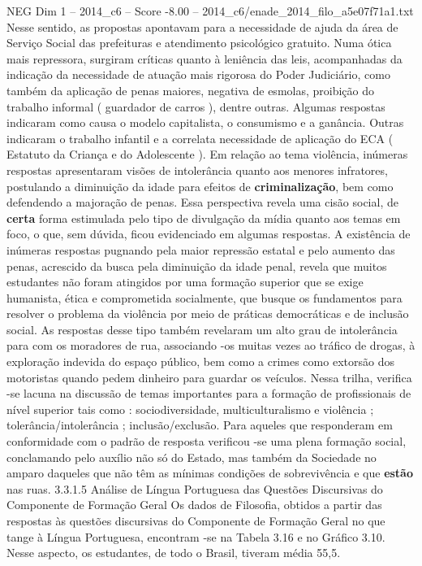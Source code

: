 \begin{textsample}{NEG Dim 1 – 2014\_c6 – Score -8.00 – 2014\_c6/enade\_2014\_filo\_a5e07f71a1.txt}
Nesse sentido, as propostas apontavam para a necessidade de ajuda da área de Serviço Social das prefeituras e atendimento psicológico gratuito.
Numa ótica mais repressora, surgiram críticas quanto à leniência das leis, acompanhadas da indicação da necessidade de atuação mais rigorosa do Poder Judiciário, como também da aplicação de penas maiores, negativa de esmolas, proibição do trabalho informal ( guardador de carros ), dentre outras.
Algumas respostas indicaram como causa o modelo capitalista, o consumismo e a ganância.
Outras indicaram o trabalho infantil e a correlata necessidade de aplicação do ECA ( Estatuto da Criança e do Adolescente ).
Em relação ao tema violência, inúmeras respostas apresentaram visões de intolerância quanto aos menores infratores, postulando a diminuição da idade para efeitos de \textbf{criminalização}, bem como defendendo a majoração de penas.
Essa perspectiva revela uma cisão social, de \textbf{certa} forma estimulada pelo tipo de divulgação da mídia quanto aos temas em foco, o que, sem dúvida, ficou evidenciado em algumas respostas.
A existência de inúmeras respostas pugnando pela maior repressão estatal e pelo aumento das penas, acrescido da busca pela diminuição da idade penal, revela que muitos estudantes não foram atingidos por uma formação superior que se exige humanista, ética e comprometida socialmente, que busque os fundamentos para resolver o problema da violência por meio de práticas democráticas e de inclusão social.
As respostas desse tipo também revelaram um alto grau de intolerância para com os moradores de rua, associando -os muitas vezes ao tráfico de drogas, à exploração indevida do espaço público, bem como a crimes como extorsão dos motoristas quando pedem dinheiro para guardar os veículos.
Nessa trilha, verifica -se lacuna na discussão de temas importantes para a formação de profissionais de nível superior tais como : sociodiversidade, multiculturalismo e violência ; tolerância/intolerância ; inclusão/exclusão.
Para aqueles que responderam em conformidade com o padrão de resposta verificou -se uma plena formação social, conclamando pelo auxílio não só do Estado, mas também da Sociedade no amparo daqueles que não têm as mínimas condições de sobrevivência e que \textbf{estão} nas ruas. 3.3.1.5 Análise de Língua Portuguesa das Questões Discursivas do Componente de Formação Geral Os dados de Filosofia, obtidos a partir das respostas às questões discursivas do Componente de Formação Geral no que tange à Língua Portuguesa, encontram -se na Tabela 3.16 e no Gráfico 3.10.
Nesse aspecto, os estudantes, de todo o Brasil, tiveram média 55,5.

\end{textsample}
